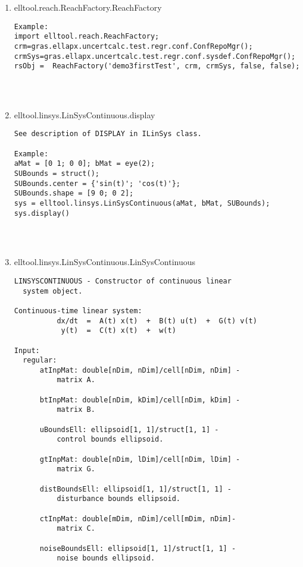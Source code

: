 \begin{enumerate}
\begin{lstlisting}
\end{lstlisting}
\fontfamily{\familydefault}
\selectfont
\item {elltool.reach.ReachFactory.ReachFactory}
\selectfont
\begin{lstlisting}
Example:
import elltool.reach.ReachFactory;
crm=gras.ellapx.uncertcalc.test.regr.conf.ConfRepoMgr();
crmSys=gras.ellapx.uncertcalc.test.regr.conf.sysdef.ConfRepoMgr();
rsObj =  ReachFactory('demo3firstTest', crm, crmSys, false, false);




\end{lstlisting}
\fontfamily{\familydefault}
\selectfont
\item {elltool.linsys.LinSysContinuous.display}
\selectfont
\begin{lstlisting}
See description of DISPLAY in ILinSys class.

Example:
aMat = [0 1; 0 0]; bMat = eye(2);
SUBounds = struct();
SUBounds.center = {'sin(t)'; 'cos(t)'};
SUBounds.shape = [9 0; 0 2];
sys = elltool.linsys.LinSysContinuous(aMat, bMat, SUBounds);
sys.display()




\end{lstlisting}
\fontfamily{\familydefault}
\selectfont
\item {elltool.linsys.LinSysContinuous.LinSysContinuous}
\selectfont
\begin{lstlisting}
LINSYSCONTINUOUS - Constructor of continuous linear
  system object.

Continuous-time linear system:
          dx/dt  =  A(t) x(t)  +  B(t) u(t)  +  G(t) v(t)
           y(t)  =  C(t) x(t)  +  w(t)

Input:
  regular:
      atInpMat: double[nDim, nDim]/cell[nDim, nDim] -
          matrix A.

      btInpMat: double[nDim, kDim]/cell[nDim, kDim] -
          matrix B.

      uBoundsEll: ellipsoid[1, 1]/struct[1, 1] -
          control bounds ellipsoid.

      gtInpMat: double[nDim, lDim]/cell[nDim, lDim] -
          matrix G.

      distBoundsEll: ellipsoid[1, 1]/struct[1, 1] -
          disturbance bounds ellipsoid.

      ctInpMat: double[mDim, nDim]/cell[mDim, nDim]-
          matrix C.

      noiseBoundsEll: ellipsoid[1, 1]/struct[1, 1] -
          noise bounds ellipsoid.


\end{lstlisting}
\end{enumerate}
